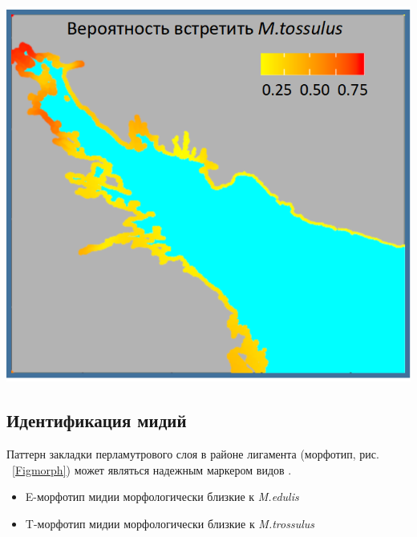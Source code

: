 \documentclass[a0,portrait]{a0poster}
\begin{document}
\begin{minipage}[t]{0.5\linewidth}
\begin{minipage}[t]{0.4\linewidth}
\end{minipage}\hspace{1cm}
%
\begin{minipage}[t]{0.5\linewidth}
	\begin{center} \vspace{0.1cm}
			\includegraphics[width=0.9\linewidth]{Mytred_distr.png}
			\label{Fig_distred}
		\end{center}\vspace{0.5cm}
\end{minipage}


		\color{DarkSlateGray} %
		
% 
% 


\subsection*{Идентификация мидий}


%
\begin{minipage}[b]{0.4\linewidth}

Паттерн закладки перламутрового слоя в районе лигамента (морфотип, рис. ~\ref{Figmorph}) может являться надежным маркером видов \citep{katolikova2016genetic}.   

\begin{itemize}
  \item E-морфотип мидии морфологически близкие к \emph{M.edulis} 
  \item  T-морфотип мидии морфологически близкие к \emph{M.trossulus}
\end{itemize}
 


\end{minipage}
\end{minipage}
\end{document}
